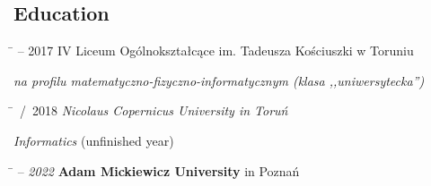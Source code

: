 \documentclass[a4paper]{res}
\begin{document}
\begin{resume}
    \vspace{-0.13in}
    \section{Education}
    \vspace{-0.05in}
    \begin{tabbing}
        \hspace{1.3in}\=  – 2017 \>
        IV Liceum Ogólnokształcące
        im. Tadeusza Kościuszki w Toruniu
    \end{tabbing}
    \vspace{-10pt}
    \vspace{-10pt}
    \hspace{1in}\textsl{na profilu matematyczno-fizyczno-informatycznym (klasa ,,uniwersytecka'')}
    \vspace{-0.2in}
    \begin{tabbing}
        \hspace{1.3in}\= ~/~2018 \>
        \textsl{Nicolaus Copernicus University in Toruń}
    \end{tabbing}\vspace{-20pt}
    \hspace{1in}\textsl{Informatics} (unfinished  year)
    \vspace{-0.2in}
    \begin{tabbing}
        \hspace{1.3in}\=  – \textsl{2022} \>
        \textbf{Adam Mickiewicz University} in Poznań
    \end{tabbing}\vspace{-20pt}
    \vspace{-0.2in}

\end{resume}
\end{document}
